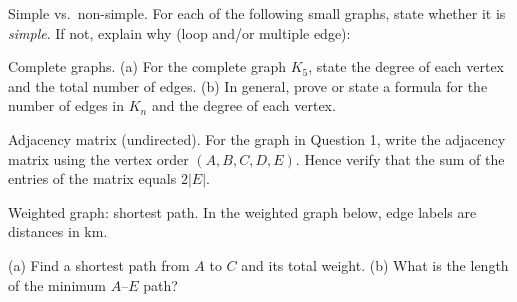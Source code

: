 \documentclass[11pt]{article}
\def\textbf#1{#1}%
\newcounter{question}
\begin{document}
\begin{question}
\textbf{Simple vs.\ non-simple.}
For each of the following small graphs, state whether it is \emph{simple}. If not, explain why (loop and/or multiple edge):
\begin{center}
\qquad
{}
\end{center}
\end{question}

\begin{question}
\textbf{Complete graphs.}
(a) For the complete graph $K_5$, state the degree of each vertex and the total number of edges.  
(b) In general, prove or state a formula for the number of edges in $K_n$ and the degree of each vertex.
\end{question}

\begin{question}
\textbf{Adjacency matrix (undirected).}
For the graph in Question 1, write the adjacency matrix using the vertex order $(A,B,C,D,E)$.  
Hence verify that the sum of the entries of the matrix equals $2|E|$.
\end{question}

\begin{question}
\textbf{Weighted graph: shortest path.}
In the weighted graph below, edge labels are distances in km.
\begin{center}
\end{center}
(a) Find a shortest path from $A$ to $C$ and its total weight.  
(b) What is the length of the minimum $A$–$E$ path?
\end{question}
\end{document}
